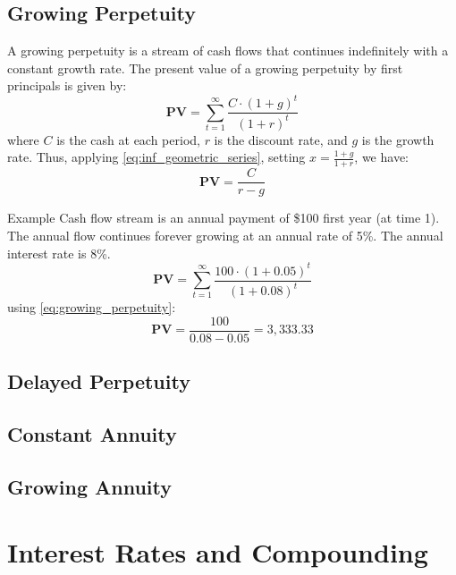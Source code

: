 \subsection{Growing Perpetuity}
A growing perpetuity is a stream of cash flows that continues indefinitely with a constant growth rate. The present value of a growing perpetuity by first principals is given by:
$$
\textbf{PV} = \sum_{t=1}^{\infty} \frac{C \cdot (1 + g)^t}{(1 + r)^t}
$$
where $C$ is the cash at each period, $r$ is the discount rate, and $g$ is the growth rate. Thus, applying \eqref{eq:inf_geometric_series}, setting $x = \frac{1 + g}{1 + r}$, we have:
\begin{equation}\label{eq:growing_perpetuity}
\textbf{PV} = \frac{C}{r - g}
\end{equation}
\begin{examplebox}{Example}
	Cash flow stream is an annual payment of \$100 first year (at time 1). The annual flow continues forever growing at an annual rate of 5\%. The annual interest rate is 8\%.
	$$
	\textbf{PV} = \sum_{t=1}^{\infty} \frac{100 \cdot (1 + 0.05)^t}{(1 + 0.08)^t}
	$$
	using \eqref{eq:growing_perpetuity}:
	$$
	\textbf{PV} = \frac{100}{0.08 - 0.05} = 3,333.33
	$$
\end{examplebox}
\subsection{Delayed Perpetuity}
\subsection{Constant Annuity}
\subsection{Growing Annuity}
\section{Interest Rates and Compounding}

